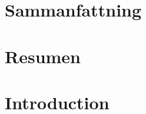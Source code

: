 \documentclass[showtrims, oldfontcommands]{kthesis}
\begin{document}
\begin{abstract}
    Our solutions are some concrete examples of how privacy as data control, as 
    envisioned by Anita Allen, can be achieved in different degrees and scenarios 
    within centralised and decentralised \aclp*{is}. Nonetheless, we hope that the 
    privacy-preserving protocols we propose can be useful in other scenarios to 
    mitigate the diverse dangers to personal privacy that we are facing nowadays.
    
\end{abstract}
\clearpage

\cleardoublepage
{}
\chapter*{Sammanfattning}
\renewcommand{\abstractname}{\vspace{-\baselineskip}}
\begin{abstract}
    TODO
\end{abstract}
\clearpage

\cleardoublepage
{}
\chapter*{Resumen}
\renewcommand{\abstractname}{\vspace{-\baselineskip}}
\begin{abstract}
    TODO
\end{abstract}
\clearpage


\pagestyle{headings}

%
% 

%
\clearforchapter
\tableofcontents
\cleardoublepage

\mainmatter

%
\cleardoublepage
\chapter{Introduction}
    \label{chapter:thesis:introduction}

\clearpage
\end{document}
